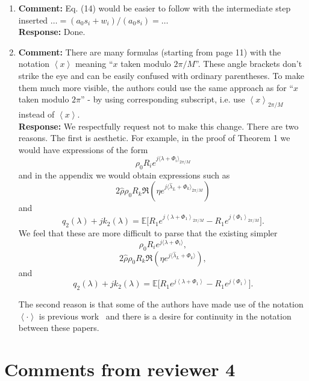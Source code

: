 \documentclass{article}
\newcommand{\fracpart}[1]{\left\langle #1 \right\rangle}
\newcommand{\sfracpart}[1]{\langle #1 \rangle}
\newcommand{\expect}{{\mathbb E}}
\begin{document}
\begin{enumerate}

\item \textbf{Comment:}  Eq. (14) would be easier to follow with the intermediate step inserted $\dots = (a_0s_i + w_i)/(a_0s_i) = \dots$ \\
\textbf{Response:} Done.

\item \textbf{Comment:}  There are many formulas (starting from page 11) with the notation $\fracpart{x}$ meaning ``$x$ taken modulo $2\pi/M$''. These angle brackets don't strike the eye and can be easily confused with ordinary parentheses. To make them much more visible, the authors could use the same approach as for ``$x$ taken modulo $2\pi$'' - by using corresponding subscript, i.e. use $\fracpart{x}_{2\pi/M}$ instead of $\fracpart{x}$. \\
\textbf{Response:} We respectfully request not to make this change.  There are two reasons.  The first is aesthetic.  For example, in the proof of Theorem 1 we would have expressions of the form
\[
\rho_0 R_i e^{j\sfracpart{\lambda + \Phi_i}_{2\pi/M}}
\]
and in the appendix we would obtain expressions such as
\[
2 \hat{\rho} \rho_0 R_k \Re\left( \eta e^{j\sfracpart{\hat{\lambda}_L + \Phi_k}_{2\pi/M}}\right)
\]
and
\[
q_2(\lambda) + j k_2(\lambda) = \expect\big[ R_1 e^{j\fracpart{\lambda + \Phi_1}_{2\pi/M}} - R_1 e^{j\fracpart{\Phi_1}_{2\pi/M}}  \big].
\]
We feel that these are more difficult to parse that the existing simpler
\[
\rho_0 R_i e^{j\sfracpart{\lambda + \Phi_i}},
\]
\[
2 \hat{\rho} \rho_0 R_k \Re\left( \eta e^{j\sfracpart{\hat{\lambda}_L + \Phi_k}}\right),
\]
and
\[
q_2(\lambda) + j k_2(\lambda) = \expect\big[ R_1 e^{j\fracpart{\lambda + \Phi_1}} - R_1 e^{j\fracpart{\Phi_1}}  \big].
\]

The second reason is that some of the authors have made use of the notation $\fracpart{\cdot}$ is previous work~\cite{McKilliamFrequencyEstimationByPhaseUnwrapping2009,McKilliam_mean_dir_est_sq_arc_length2010,McKilliam_pps_unwrapping_tsp_2014} and there is a desire for continuity in the notation between these papers.

 \end{enumerate}

\section{Comments from reviewer 4}
\end{document}
